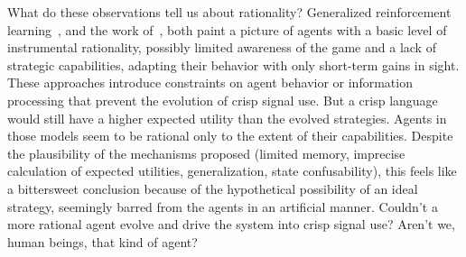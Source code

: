 \documentclass[a4paper]{article}
\begin{document}
What do these observations tell us about rationality?
Generalized reinforcement learning~\parencite{oconnor_evolution_2014}, and the work of~\textcite{franke_vagueness_2017}, both paint a picture of agents with a basic level of instrumental rationality, possibly limited awareness of the game and a lack of strategic capabilities, adapting their behavior with only short-term gains in sight.
These approaches introduce constraints on agent behavior or information processing that prevent the evolution of crisp signal use.
But a crisp language would still have a higher expected utility than the evolved strategies.
Agents in those models seem to be rational only to the extent of their capabilities.
Despite the plausibility of the mechanisms proposed (limited memory, imprecise calculation of expected utilities, generalization, state confusability), this feels like a bittersweet conclusion because of the hypothetical possibility of an ideal strategy, seemingly barred from the agents in an artificial manner.
Couldn't a more rational agent evolve and drive the system into crisp signal use?
Aren't we, human beings, that kind of agent?
\end{document}
